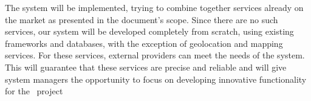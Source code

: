 The system will be implemented, trying to combine together services already on the market as presented in the document's scope. Since there are no such services, our system will be developed completely from scratch, using existing frameworks and databases, with the exception of geolocation and mapping services. For these services, external providers can meet the needs of the system. This will guarantee that these services are precise and reliable and will give system managers the opportunity to focus on developing innovative functionality for the \projectname~project
